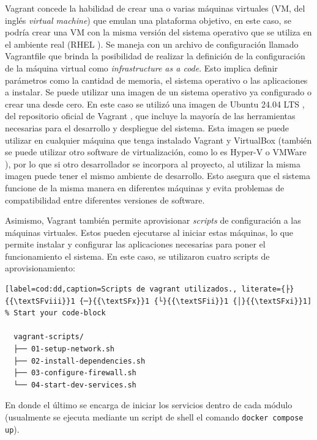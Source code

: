 Vagrant concede la habilidad de crear una o varias máquinas virtuales (VM, del inglés \textit{virtual machine}) que emulan una plataforma objetivo, en este caso, se podría crear una VM con la misma versión del sistema operativo que se utiliza en el ambiente real (RHEL \citep{red_hat_sistema_nodate}). Se maneja con un archivo de configuración llamado Vagrantfile que brinda la posibilidad de realizar la definición de la configuración de la máquina virtual como \textit{infrastructure as a code}. Esto implica definir parámetros como la cantidad de memoria, el sistema operativo o las aplicaciones a instalar. Se puede utilizar una imagen de un sistema operativo ya configurado o crear una desde cero. En este caso se utilizó una imagen de Ubuntu 24.04 LTS \citep{progress_chefs_bento_bentoubuntu-2404_nodate}, del repositorio oficial de Vagrant \citep{hashicorp_hashicorp_nodate}, que incluye la mayoría de las herramientas necesarias para el desarrollo y despliegue del sistema. Esta imagen se puede utilizar en cualquier máquina que tenga instalado Vagrant y VirtualBox \citep{wikipedia_virtualbox_2025} (también se puede utilizar otro software de virtualización, como lo es Hyper-V \citep{meaghanlewis_informacion_2025} o VMWare \citep{wikipedia_vmware_2025}), por lo que si otro desarrollador se incorpora al proyecto, al utilizar la misma imagen puede tener el mismo ambiente de desarrollo. Esto asegura que el sistema funcione de la misma manera en diferentes máquinas y evita problemas de compatibilidad entre diferentes versiones de software.

Asimismo, Vagrant también permite aprovisionar \textit{scripts} de configuración a las máquinas virtuales. Estos pueden ejecutarse al iniciar estas máquinas, lo que permite instalar y configurar las aplicaciones necesarias para poner el funcionamiento el sistema. En este caso, se utilizaron cuatro scripts de aprovisionamiento:

\begin{lstlisting}[label=cod:dd,caption=Scripts de vagrant utilizados., literate={├}{{\textSFviii}}1 {─}{{\textSFx}}1 {└}{{\textSFii}}1 {│}{{\textSFxi}}1]  % Start your code-block

  vagrant-scripts/
  ├── 01-setup-network.sh
  ├── 02-install-dependencies.sh
  ├── 03-configure-firewall.sh
  └── 04-start-dev-services.sh

\end{lstlisting}

En donde el último se encarga de iniciar los servicios dentro de cada módulo (usualmente se ejecuta mediante un script de shell el comando \lstinline[language=sh]|docker compose up|).


